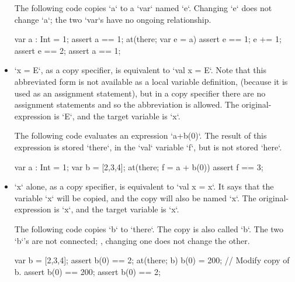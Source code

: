 \begin{itemize}
\begin{ex}
The following code copies \xcd`a` to a \xcd`var` named \xcd`e`.  Changing
\xcd`e` does not change \xcd`a`; the two \xcd`var`s have no ongoing relationship.
\begin{xten}
var a : Int = 1;
assert a == 1;
at(there; var e = a) { 
   assert e == 1;
   e += 1;
   assert e == 2;
}
assert a == 1; 
\end{xten}
% 
\end{ex}

\item \xcd`x = E`, as a copy specifier, is equivalent to \xcd`val x = E`.
      Note that this abbreviated form is not available as a local variable
      definition, (because it is used as an assignment statement), but in a
      copy specifier there are no assignment statements and so the
      abbreviation is allowed.
      The original-expression is \xcd`E`, and the target variable is \xcd`x`.

\begin{ex}
The following code evaluates an expression \xcd`a+b(0)`.  The result of this
expression is stored \xcd`there`, in the \xcd`val` variable \xcd`f`, but is
not stored \xcd`here`. 
\begin{xten}
var a : Int = 1;
var b = [2,3,4];
at(there; f = a + b(0)) {
   assert f == 3;
}
\end{xten}
% 


\end{ex}

\item \xcd`x` alone, as a copy specifier, is equivalent to \xcd`val x = x`.
      It says that the variable \xcd`x` will be copied, and the copy will also
      be named \xcd`x`.  
      The original-expression is \xcd`x`, and the target variable is \xcd`x`.

\begin{ex}
The following code copies \xcd`b` to \xcd`there`.  The copy is also called
\xcd`b`.  The two \xcd`b`'s are not connected; \eg, changing one does not
change the other.
\begin{xten}
var b = [2,3,4];
assert b(0) == 2;
at(there; b) {
  b(0) = 200;  // Modify copy of b.
  assert b(0) == 200;
}
assert b(0) == 2; 
\end{xten}
% 
\end{ex}


\end{itemize}
